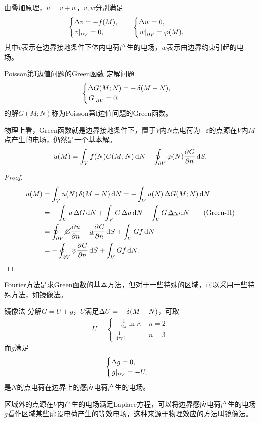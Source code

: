 由叠加原理，$u=v+w$，$v,w$分别满足
\begin{align*}
	\begin{cases}
		\Delta v=-f(M),\\
		\left.v\right\rvert_{\partial V}=0,
	\end{cases}\quad
	\begin{cases}
		\Delta w=0,\\
		\left.w\right\rvert_{\partial V}=\varphi(M),
	\end{cases}
\end{align*}
其中$v$表示在边界接地条件下体内电荷产生的电场，$w$表示由边界约束引起的电场。
\begin{definition}{Poisson第I边值问题的Green函数}{}
	定解问题
	\begin{align}
		\begin{cases}
			\Delta G(M;N)=-\mathop{}\!\delta(M-N),\\
			\left.G\right\rvert_{\partial V}=0.
		\end{cases}
	\end{align}
	的解$G(M;N)$称为Poisson第I边值问题的Green函数。
\end{definition}
物理上看，Green函数就是边界接地条件下，置于$V$内$N$点电荷为$+\varepsilon$的点源在$V$内$M$点产生的电场，仍然是一个基本解。
\begin{align}
	u(M)=\int_Vf(N)G(M;N)\mathop{}\!\mathrm{d} N-\oint_{\partial V}\varphi(N)\frac{\partial^{{}}G}{\partial{n}^{{}}}\mathop{}\!\mathrm{d} S.
\end{align}
\begin{proof}
	\begin{align*}
		u(M)&=\int_Vu(N)\vd(M-N)\d N=-\int_Vu(N)\,\D G(M;N)\d N\\
		&=-\int_V u\,\D G\d N+\int_VG\,\D u\d N-\int_VG\,\underline{\D u}\d N\tag{Green-II}\\
		&=\oint_{\p V}\cancel{G}\pv un-\underline{u}\pv Gn\d S+\int_VG f\d N\\
		&=-\oint_{\p V}\psi\pv Gn\d S+\int_VGf\d N.
	\end{align*}
\end{proof}
Fourier方法是求Green函数的基本方法，但对于一些特殊的区域，可以采用一些特殊方法，如镜像法。
\begin{method}{镜像法}{}
	分解$G=U+g$，$U$满足$\Delta U=-\mathop{}\!\delta(M-N)$，可取
	\begin{align*}
		U=\begin{cases}
			-\frac1{2\pi}\ln r,&n=2\\[1ex]
			\frac1{4\pi r},&n= 3
		\end{cases}
	\end{align*}
	而$g$满足 
	\[
		\begin{cases}
			\Delta g=0,\\
			\left.g\right\rvert_{\partial V}=-U,
		\end{cases}
	\]
	是$N$的点电荷在边界上的感应电荷产生的电场。
	
	区域外的点源在$V$内产生的电场满足Laplace方程，可以将边界感应电荷产生的电场$g$看作区域某些虚设电荷产生的等效电场，这种来源于物理效应的方法叫镜像法。%
\end{method}
